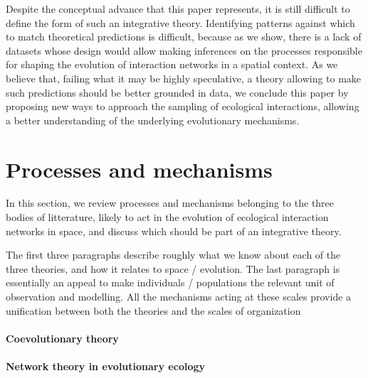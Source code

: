 \documentclass[11pt,oneside]{article}
\begin{document}
Despite the conceptual advance that this paper represents, it is still
difficult to define the form of such an integrative theory. Identifying
patterns against which to match theoretical predictions is difficult, because
as we show, there is a lack of datasets whose design would allow making
inferences on the processes responsible for shaping the evolution of
interaction networks in a spatial context. As we believe that, failing what it
may be highly speculative, a theory allowing to make such predictions should
be better grounded in data, we conclude this paper by proposing new ways to
approach the sampling of ecological interactions, allowing a better understanding
of the underlying evolutionary mechanisms.

%

\section{Processes and mechanisms}

In this section, we review processes and mechanisms belonging to the three
bodies of litterature, likely to act in the evolution of ecological
interaction networks in space, and discuss which should be part of an
integrative theory.

The first three paragraphs describe roughly what we know about each of the three
theories, and how it relates to space / evolution. The last paragraph is
essentially an appeal to make individuals / populations the relevant unit of
observation and modelling. All the mechanisms acting at these scales provide a
unification between both the theories and the scales of organization

\paragraph{Coevolutionary theory}

\paragraph{Network theory in evolutionary ecology}

\end{document}
